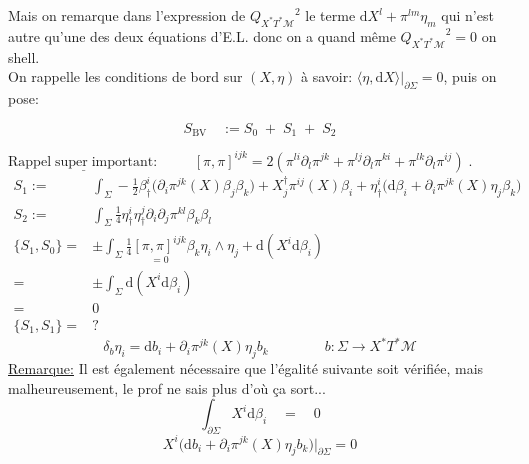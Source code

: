\documentclass[a4paper,11pt]{article}
\renewcommand{\d}{{\mathrm{d}}}
\begin{document}
Mais on remarque dans l'expression de ${Q_{X^*T^*\mathcal{M}}}^2$ le terme $\d X^l + \pi^{lm} \eta_m$ qui n'est autre qu'une des deux équations d'E.L. donc on a quand même ${Q_{X^*T^*\mathcal{M}}}^2=0$ on shell.\\
On rappelle les conditions de bord sur $(X,\eta)$ à savoir: $\langle\eta,\d X\rangle\Big|_{\partial\Sigma} = 0$, puis on pose:

$$S_\mathrm{BV} \quad := S_0 \;+\; S_1\;+\;S_2$$

$$\underline{\mathrm{Rappel}\;\mathrm{super}\;\mathrm{important}:}\quad \quad \boxed{\boxed{\;\,[\pi,\pi]^{ijk} = 2 \left(\pi^{li}\partial_l \pi^{jk} + \pi^{lj}\partial_l\pi^{ki} + \pi^{lk}\partial_l \pi^{ij}\right)\;\Bigg.}}\quad\quad\quad\quad\quad\quad\quad\quad$$
\begin{align*}
S_1 :=& \int_\Sigma - \frac12 \beta^i_\dag \Big( \partial_i \pi^{jk}(X)\beta_j \beta_k\Big) + X_j^\dag \pi^{ij}(X)\beta_i + \eta^i_\dag \Big( \d\beta_i + \partial_i \pi^{jk}(X)\eta_j\beta_k\Big)\\
S_2 :=& \int_\Sigma \frac14 \eta^i_\dag \eta^j_\dag \partial_i\partial_j\pi^{kl}\beta_k\beta_l\\
\{S_1,S_0\} =& \pm \int_\Sigma \frac14 \underset{=0}{[\pi,\pi]^{ijk}}\beta_k \eta_i\wedge\eta_j + \d(X^i\d \beta_i)\\
=& \pm \int_\Sigma \d(X^i\d \beta_i)\\
=& 0\\
\{S_1,S_1\} =& ?
\end{align*}
$$\delta_b \eta_i = \d b_i + \partial_i \pi^{jk}(X)\eta_j b_k \quad\quad\quad\quad b: \Sigma\to X^*T^*\mathcal{M}$$
\underline{Remarque:} Il est également nécessaire que l'égalité suivante soit vérifiée, mais malheureusement, le prof ne sais plus d'où ça sort...
$$\int_{\partial\Sigma} X^i\d \beta_i \quad = \quad 0$$
$$X^i\Big(\d b_i + \partial_i \pi^{jk}(X)\eta_jb_k\Big)\bigg|_{\partial\Sigma} = 0$$
\end{document}
